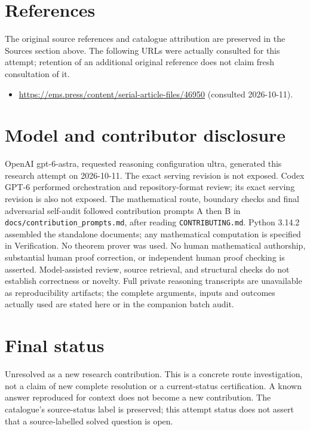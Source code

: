 \documentclass[11pt]{article}
\begin{document}
\section{References}
The original source references and catalogue attribution are preserved in the
Sources section above. The following URLs were actually consulted for this attempt;
retention of an additional original reference does not claim fresh consultation of it.
\begin{itemize}
\item \url{https://ems.press/content/serial-article-files/46950} (consulted 2026-10-11). 
\end{itemize}
\section{Model and contributor disclosure}
OpenAI gpt-6-astra, requested reasoning configuration ultra, generated this research
attempt on 2026-10-11. The exact serving revision is not exposed. Codex GPT-6
performed orchestration and repository-format review; its exact serving revision
is also not exposed. The mathematical route, boundary checks and final adversarial
self-audit followed contribution prompts A then B in
\texttt{docs/contribution\_prompts.md}, after reading \texttt{CONTRIBUTING.md}.
Python 3.14.2 assembled the standalone documents; any mathematical computation is
specified in Verification. No theorem prover was used. No human mathematical
authorship, substantial human proof correction, or independent human proof checking
is asserted. Model-assisted review, source retrieval, and structural checks do not
establish correctness or novelty. Full private reasoning transcripts are unavailable
as reproducibility artifacts; the complete arguments, inputs and outcomes actually
used are stated here or in the companion batch audit.
\section{Final status}
Unresolved as a new research contribution. This is a concrete route investigation,
not a claim of new complete resolution or a current-status certification. A known
answer reproduced for context does not become a new contribution. The catalogue's
source-status label is preserved; this attempt status does not assert that a
source-labelled solved question is open.
\end{document}
